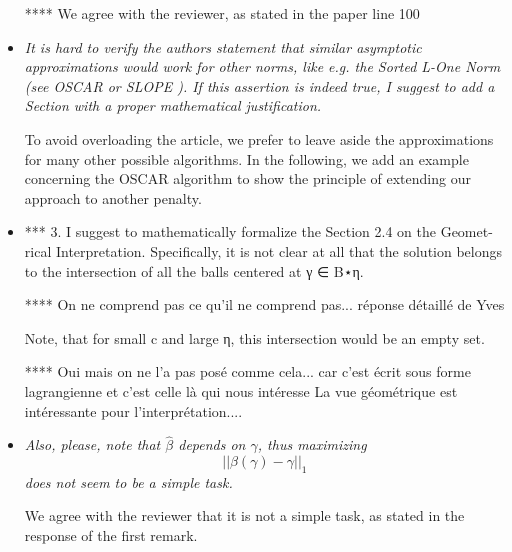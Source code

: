 \documentclass[a4paper,11pt]{texMemo}
\begin{document}
\begin{itemize}
**** We agree with the reviewer, as stated in the paper line 100

\item 
  \emph{It is hard to verify the authors statement that similar asymptotic approximations would work for other norms,  like e.g.
    the Sorted L-One Norm (see OSCAR \citep{Bondell08} or SLOPE \citep{bogdan2015slope}).
    If this assertion is indeed true,
    I suggest to add a Section with a proper mathematical justification.}



To avoid overloading the article, we prefer to leave aside the approximations for many other possible algorithms. In the following, we add an example concerning the OSCAR algorithm to show the principle of extending our approach to another penalty.

  




\item 
*** 3. I suggest to mathematically formalize the Section 2.4 
on the Geomet- rical Interpretation. Specifically,
 it is not clear at all that the solution belongs to the intersection of all the balls centered at γ ∈ B⋆η. 

**** On ne comprend pas ce qu'il ne comprend pas... réponse détaillé de Yves

Note, that for small c and large η, this intersection would be an empty set.

**** Oui mais on ne l'a pas posé comme cela... car c'est écrit sous forme lagrangienne et c'est celle là qui nous intéresse
La vue géométrique est intéressante pour l'interprétation.... 


\item
  \emph{Also, please, note that $\hat{\beta}$ depends on $\gamma$,
      thus maximizing $$||\beta(\gamma) − \gamma||_1$$
does not seem to be a simple task.}

We agree with the reviewer that it is not a simple task,
as stated in the response of the first remark. 




\end{itemize}
\end{document}
